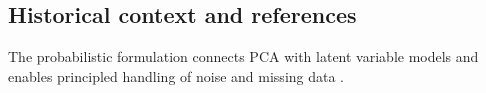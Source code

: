 
\subsection{Historical context and references}

The probabilistic formulation connects PCA with latent variable models and enables principled handling of noise and missing data \textcite{Bishop2006,GoodfellowEtAl2016}.
